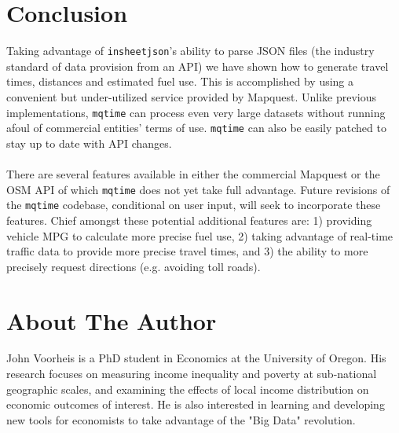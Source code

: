 \documentclass[11pt]{article}
\begin{document}
\section{Conclusion}
Taking advantage of \verb|insheetjson|'s ability to parse JSON files (the industry standard of data provision from an API) we have shown how to generate travel times, distances and estimated fuel use. This is accomplished by using a convenient but under-utilized service provided by Mapquest. Unlike previous implementations, \verb|mqtime| can process even very large datasets without running afoul of commercial entities' terms of use. \verb|mqtime| can also be easily patched to stay up to date with API changes. 
\\ \\
There are several features available in either the commercial Mapquest or the OSM API of which \verb|mqtime| does not yet take full advantage. Future revisions of the \verb|mqtime| codebase, conditional on user input, will seek to incorporate these features. Chief amongst these potential additional features are: 1) providing vehicle MPG to calculate more precise fuel use, 2) taking advantage of real-time traffic data to provide more precise travel times, and 3) the ability to more precisely request directions (e.g. avoiding toll roads).



\nocite{Ozimek2011, Traveltime3, MapquestTOU, OSMTOU}

\section*{About The Author}
John Voorheis is a PhD student in Economics at the University of Oregon. His research focuses on measuring income inequality and poverty at sub-national geographic scales, and examining the effects of local income distribution on economic outcomes of interest. He is also interested in learning and developing new tools for economists to take advantage of the "Big Data" revolution.
\end{document}
